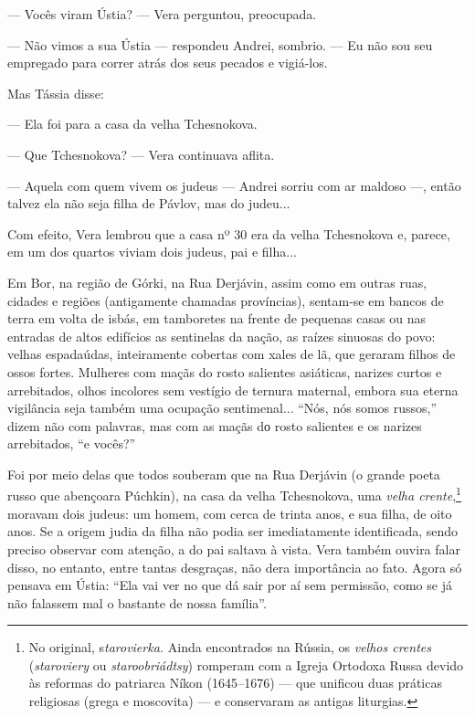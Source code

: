 --- Vocês viram Ústia? --- Vera perguntou, preocupada.

--- Não vimos a sua Ústia --- respondeu Andrei, sombrio. --- Eu não sou
seu empregado para correr atrás dos seus pecados e vigiá-los.

Mas Tássia disse:

--- Ela foi para a casa da velha Tchesnokova.

--- Que Tchesnokova? --- Vera continuava aflita.

--- Aquela com quem vivem os judeus --- Andrei sorriu com ar maldoso
---, então talvez ela não seja filha de Pávlov, mas do judeu...

Com efeito, Vera lembrou que a casa nº 30 era da velha Tchesnokova e,
parece, em um dos quartos viviam dois judeus, pai e filha...

Em Bor, na região de Górki, na Rua Derjávin, assim como em outras ruas,
cidades e regiões (antigamente chamadas províncias), sentam-se em bancos
de terra em volta de isbás, em tamboretes na frente de pequenas casas ou
nas entradas de altos edifícios as sentinelas da nação, as raízes
sinuosas do povo: velhas espadaúdas, inteiramente cobertas com xales de
lã, que geraram filhos de ossos fortes. Mulheres com maçãs do rosto
salientes asiáticas, narizes curtos e arrebitados, olhos incolores sem
vestígio de ternura maternal, embora sua eterna vigilância seja também
uma ocupação sentimenal... ``Nós, nós somos russos,'' dizem não com
palavras, mas com as maçãs dо rosto salientes e os narizes arrebitados,
``e vocês?''

Foi por meio delas que todos souberam que na Rua Derjávin (o grande
poeta russo que abençoara Púchkin), na casa da velha Tchesnokova, uma
\emph{velha crente},\footnote{No original, s\emph{tarovierka.} Ainda
  encontrados na Rússia, os \emph{velhos crentes} (\emph{staroviery} ou
  \emph{staroobriádtsy}) romperam com a Igreja Ortodoxa Russa devido às
  reformas do patriarca Níkon (1645\emph{--}1676) --- que unificou duas
  práticas religiosas (grega e moscovita) --- e conservaram as antigas
  liturgias.} moravam dois judeus: um homem, com cerca de trinta anos, e
sua filha, de oito anos. Se a origem judia da filha não podia ser
imediatamente identificada, sendo preciso observar com atenção, a do pai
saltava à vista. Vera também ouvira falar disso, no entanto, entre
tantas desgraças, não dera importância ao fato. Agora só pensava em
Ústia: ``Ela vai ver no que dá sair por aí sem permissão, como se já não
falassem mal o bastante de nossa família''.

